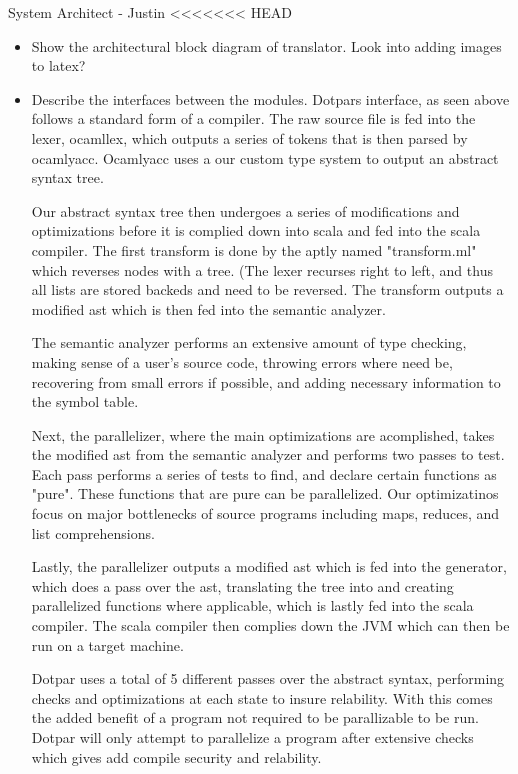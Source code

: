 System Architect - Justin
<<<<<<< HEAD
\begin{itemize}
\item Show the architectural block diagram of translator.
Look into adding images to latex?

\item Describe the interfaces between the modules.
Dotpars interface, as seen above follows a standard form of a compiler. The raw
source file is fed into the lexer, ocamllex, which outputs a series of tokens that is then
parsed by ocamlyacc.  Ocamlyacc uses a our custom type system to output an abstract
syntax tree.

Our abstract syntax tree then undergoes a series of modifications and optimizations before it
is complied down into scala and fed into the scala compiler.  The first transform
is done by the aptly named "transform.ml" which reverses nodes with a tree.  (The lexer
recurses right to left, and thus all lists are stored backeds and need to be reversed.
The transform outputs a modified ast which is then fed into the semantic analyzer.

The semantic analyzer performs an extensive amount of type checking, making 
sense of a user's source code, throwing errors where need be, recovering from 
small errors if possible,  and adding necessary information to the symbol table.  

Next, the parallelizer, where the main optimizations are acomplished, takes 
the modified ast from the semantic analyzer and performs two passes to test. 
Each pass performs a series of tests to find, and declare certain functions as "pure".
These functions that are pure can be parallelized. Our optimizatinos focus on major
bottlenecks of source programs including maps, reduces, and list comprehensions.

Lastly, the parallelizer outputs a modified ast which is fed into the generator, 
which does a pass over the ast, translating the tree into and creating parallelized 
functions where applicable, which is lastly fed into the scala compiler.  The
scala compiler then complies down the JVM which can then be run on a target machine.

Dotpar uses a total of 5 different passes over the abstract syntax, performing 
checks and optimizations at each state to insure relability.  With this comes
the added benefit of a program not required to be parallizable to be run.  Dotpar
will only attempt to parallelize a program after extensive checks which gives add 
compile security and relability.


\end{itemize}
